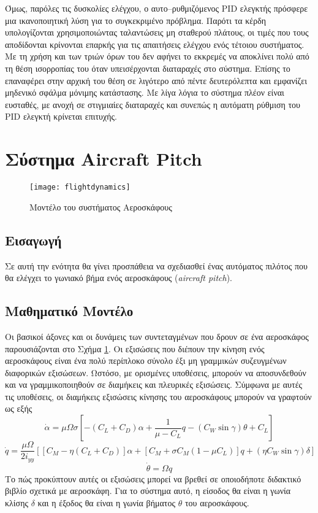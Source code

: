 Όμως, παρόλες τις δυσκολίες ελέγχου, ο αυτο--ρυθμιζόμενος PID ελεγκτής πρόσφερε μια ικανοποιητική λύση για το συγκεκριμένο πρόβλημα. Παρότι τα κέρδη υπολογίζονται χρησιμοποιώντας ταλαντώσεις μη σταθερού πλάτους, οι τιμές που τους αποδίδονται κρίνονται επαρκής για τις απαιτήσεις ελέγχου ενός τέτοιου συστήματος. Με τη χρήση και των τριών όρων του δεν αφήνει το εκκρεμές να αποκλίνει πολύ από τη θέση ισορροπίας του όταν υπεισέρχονται διαταραχές στο σύστημα. Επίσης το επαναφέρει στην αρχική του θέση σε λιγότερο από πέντε δευτερόλεπτα και εμφανίζει μηδενικό σφάλμα μόνιμης κατάστασης. Με λίγα λόγια το σύστημα πλέον είναι ευσταθές, με ανοχή σε στιγμιαίες διαταραχές και συνεπώς η αυτόματη ρύθμιση του PID ελεγκτή κρίνεται επιτυχής.

\section{Σύστημα Aircraft Pitch} \label{sec:aircraft_pitch}

\begin{figure}[h]
  \centering
  \texttt{[image: flightdynamics]}
  \caption{Μοντέλο του συστήματος Αεροσκάφους}
  \label{fig:flightdynamics}
\end{figure}

\subsection{Εισαγωγή}

Σε αυτή την ενότητα θα γίνει προσπάθεια να σχεδιασθεί ένας αυτόματος πιλότος που θα ελέγχει το γωνιακό βήμα ενός αεροσκάφους (\emph{aircraft pitch}).

\subsection{Μαθηματικό Μοντέλο}
Οι βασικοί άξονες και οι δυνάμεις των συντεταγμένων που δρουν σε ένα αεροσκάφος παρουσιάζονται στο Σχήμα \ref{fig:flightdynamics}. Οι εξισώσεις που διέπουν την κίνηση ενός αεροσκάφους είναι ένα πολύ περίπλοκο σύνολο έξι μη γραμμικών συζευγμένων διαφορικών εξισώσεων. Ωστόσο, με ορισμένες υποθέσεις, μπορούν να αποσυνδεθούν και να γραμμικοποιηθούν σε διαμήκεις και πλευρικές εξισώσεις. Σύμφωνα με αυτές τις υποθέσεις, οι διαμήκεις εξισώσεις κίνησης του αεροσκάφους μπορούν να γραφτούν ως εξής
\begin{equation}
\dot{\alpha}=\mu\Omega\sigma\left[-\left(C_L+C_D\right)\alpha+\frac{1}{\mu-C_L}q-\left(C_W\sin\gamma\right)\theta+C_L\right]
\end{equation}
\begin{equation}
\dot{q}=\frac{\mu\Omega}{2i_{yy}}\left[\left[C_M-\eta\left(C_L+C_D\right)\right]\alpha+\left[C_M+\sigma C_M\left(1-\mu C_L\right)\right]q+\left(\eta C_W\sin\gamma\right)\delta\right]
\end{equation}
\begin{equation}
\dot{\theta}=\Omega q
\end{equation}
Το πώς προκύπτουν αυτές οι εξισώσεις μπορεί να βρεθεί σε οποιοδήποτε διδακτικό βιβλίο σχετικά με αεροσκάφη. Για το σύστημα αυτό, η είσοδος θα είναι η γωνία κλίσης $\delta$ και η έξοδος θα είναι η γωνία βήματος $\theta$ του αεροσκάφους.

